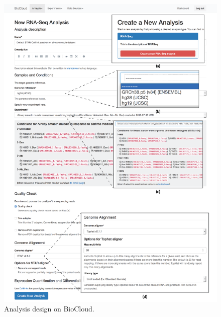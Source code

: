 \begin{figure}[!p]
\centering
\includegraphics[width=1\textwidth]{images/biocloud_analysis_design}
\caption[Analysis design on BioCloud]{
    Analysis design on BioCloud.
}
\label{fig:biocloud-analysis-design}
\end{figure}

